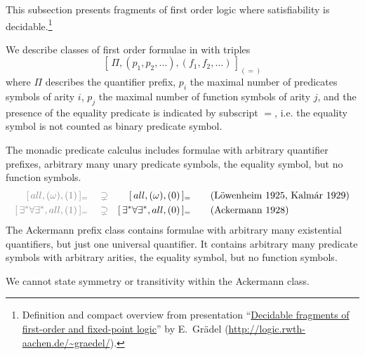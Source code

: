 
This subsection presents fragments of first order logic where satisfiability is decidable.\footnote{
	Definition and compact overview from presentation
	“\href{http://logic.rwth-aachen.de/~graedel/kalmar.pdf}{Decidable fragments of first-order and fixed-point logic}”
	by E.~Grädel (\url{http://logic.rwth-aachen.de/~graedel/}).	
}  


\begin{definition}\label{def:prefix:class}
	We describe classes of first order formulae in \PNF with triples
	\[
		[\, \Pi, (p_1,p_2,\ldots), (f_1,f_2,\ldots)\,]_{(=)}
	\]
	where $\Pi$ describes the quantifier prefix,
	$p_i$ the maximal number of predicates symbols of arity $i$,
	$p_j$ the maximal number of function symbols of arity $j$,
	and the presence of the equality predicate is indicated by subscript $=$,
	i.e. the equality symbol is not counted as binary predicate symbol.
\end{definition}

\begin{example}
	The monadic predicate calculus includes formulae with arbitrary quantifier prefixes, 
	arbitrary many unary predicate symbols, the equality symbol, but no function symbols.
	\begin{align*}
	\colG [\,all, (\omega), (1)\,]_= 
	\quad\supsetneq& &
		[\,all, (\omega), (0 )&\,]_=
		 \tag{Löwenheim 1925, Kalmár 1929}
	\\
	\colG [\,\exists^*\forall\exists^*,all,(1)\,]_=
	\quad\supsetneq& &
	[\,\exists^*\forall\exists^*,all,(0)&\,]_{=} \tag{Ackermann 1928}
	\end{align*}
	The Ackermann prefix class contains formulae with arbitrary many existential quantifiers, 
	but just one universal quantifier. It contains arbitrary many predicate symbols
	with arbitrary arities, the equality symbol, but no function symbols. 
\end{example}

\begin{remark}
	We cannot state symmetry or transitivity within the Ackermann class.
\end{remark}


